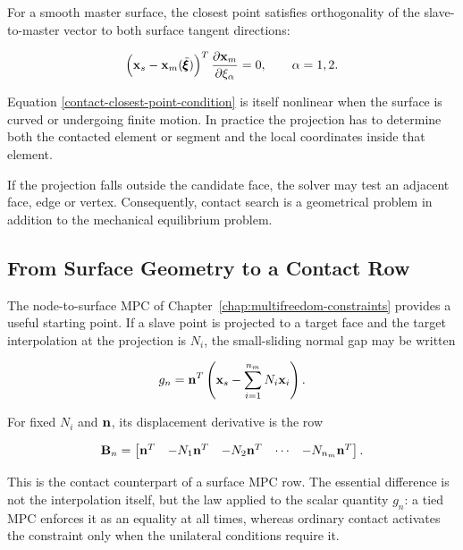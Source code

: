 For a smooth master surface, the closest point satisfies orthogonality of the
slave-to-master vector to both surface tangent directions:

\begin{equation}\label{contact-closest-point-condition}
    \left( \mathbf{x}_s - \mathbf{x}_m({}\mkern3mu\overline{\mkern-3mu\pmb{\xi}}) \right)^T
    \frac{\partial \mathbf{x}_m}{\partial \xi_\alpha} = 0,
    \qquad \alpha = 1,2.
\end{equation}

Equation \eqref{contact-closest-point-condition} is itself nonlinear when the
surface is curved or undergoing finite motion. In practice the projection has
to determine both the contacted element or segment and the local coordinates
inside that element.

If the projection falls outside the candidate face, the solver may test an
adjacent face, edge or vertex. Consequently, contact search is a geometrical
problem in addition to the mechanical equilibrium problem.


\subsection{From Surface Geometry to a Contact Row}

The node-to-surface MPC of Chapter~\ref{chap:multifreedom-constraints} provides
a useful starting point. If a slave point is projected to a target face and the
target interpolation at the projection is $N_i$, the small-sliding normal gap
may be written

\begin{equation}\label{contact-discrete-gap-row}
    g_n = \mathbf{n}^T\left(
        \mathbf{x}_s - \sum_{i=1}^{n_m} N_i \mathbf{x}_i
    \right).
\end{equation}

For fixed $N_i$ and $\mathbf{n}$, its displacement derivative is the row

\begin{equation}\label{contact-gap-B-row}
    \mathbf{B}_n =
    \begin{bmatrix}
        \mathbf{n}^T & -N_1\mathbf{n}^T & -N_2\mathbf{n}^T & \cdots & -N_{n_m}\mathbf{n}^T
    \end{bmatrix}.
\end{equation}

This is the contact counterpart of a surface MPC row. The essential difference
is not the interpolation itself, but the law applied to the scalar quantity
$g_n$: a tied MPC enforces it as an equality at all times, whereas ordinary
contact activates the constraint only when the unilateral conditions require
it.

